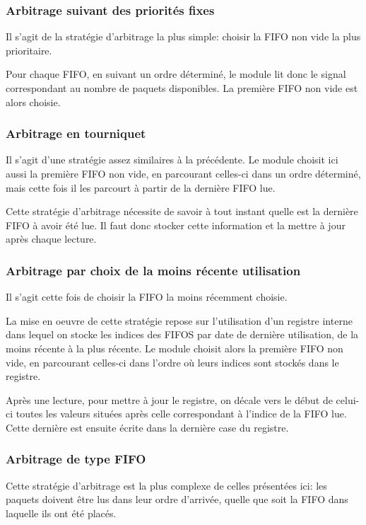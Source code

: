 \documentclass[11pt]{article}
\begin{document}
\subsubsection{Arbitrage suivant des priorités fixes}
Il s'agit de la stratégie d'arbitrage la plus simple: choisir la FIFO non vide la plus prioritaire.

Pour chaque FIFO, en suivant un ordre déterminé, le module lit donc le signal correspondant au nombre
de paquets disponibles.
La première FIFO non vide est alors choisie.

\subsubsection{Arbitrage en tourniquet}
Il s'agit d'une stratégie assez similaires à la précédente.
Le module choisit ici aussi la première FIFO non vide, en parcourant celles-ci dans un ordre déterminé,
mais cette fois il les parcourt à partir de la dernière FIFO lue.

Cette stratégie d'arbitrage nécessite de savoir à tout instant quelle est la dernière FIFO à avoir
été lue.
Il faut donc stocker cette information et la mettre à jour après chaque lecture.

\subsubsection{Arbitrage par choix de la moins récente utilisation}
Il s'agit cette fois de choisir la FIFO la moins récemment choisie.

La mise en oeuvre de cette stratégie repose sur l'utilisation d'un registre interne
dans lequel on stocke les indices des FIFOS par date de dernière utilisation, de la moins récente à la plus récente.
Le module  choisit alors la première FIFO non vide, en parcourant celles-ci dans l'ordre où leurs indices sont stockés
dans le registre.

Après une lecture, pour mettre à jour le registre, on décale vers le début de celui-ci toutes les valeurs
situées après celle correspondant à l'indice de la FIFO lue.
Cette dernière est ensuite écrite dans la dernière case du registre.

\subsubsection{Arbitrage de type FIFO}
Cette stratégie d'arbitrage est la plus complexe de celles présentées ici:
les paquets doivent être lus dans leur ordre d'arrivée, quelle que soit
la FIFO dans laquelle ils ont été placés.
\end{document}
